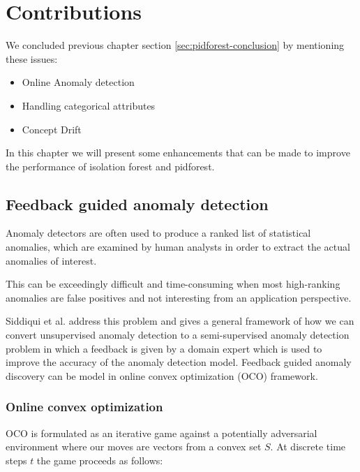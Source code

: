 \chapter{Contributions}
\label{ch:contributions}

We concluded previous chapter section \ref{sec:pidforest-conclusion} by mentioning these issues:
\vspace{-0.5em}
\begin{itemize}
    \setlength\itemsep{-0.5em}
    \item Online Anomaly detection
    \item Handling categorical attributes
    \item Concept Drift
\end{itemize}

In this chapter we will present some enhancements that can be made to improve the performance of isolation forest and pidforest.


\section{Feedback guided anomaly detection}
\label{sec:feedback-guided-anomaly-detection}

Anomaly detectors are often used to produce a ranked list of statistical anomalies, which are examined by human analysts in order to extract the actual anomalies of interest. 

This can be exceedingly difficult and time-consuming when most high-ranking anomalies are false positives and not interesting from an application perspective.

Siddiqui et al. \cite{10.1145/3219819.3220083} address this problem and gives a general framework of how we can convert unsupervised anomaly detection to a semi-supervised anomaly detection problem in which a feedback is given by a domain expert which is used to improve the accuracy of the anomaly detection model. 
Feedback guided anomaly discovery can be model in online convex optimization (OCO) framework. 


\subsection{Online convex optimization}
\label{subsec:online-convex-optimization}

OCO is formulated as an iterative game against a potentially adversarial environment where our moves are vectors from a convex set $S$.
At discrete time steps $t$ the game proceeds as follows:

